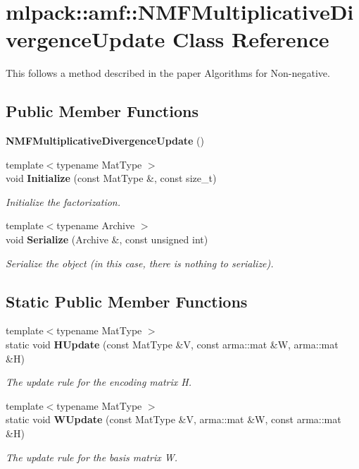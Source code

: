 \section{mlpack\+:\+:amf\+:\+:N\+M\+F\+Multiplicative\+Divergence\+Update Class Reference}
\label{classmlpack_1_1amf_1_1NMFMultiplicativeDivergenceUpdate}


This follows a method described in the paper \textquotesingle{}Algorithms for Non-\/negative.  


\subsection*{Public Member Functions}
\begin{DoxyCompactItemize}
\item 
{\bf N\+M\+F\+Multiplicative\+Divergence\+Update} ()
\item 
{\footnotesize template$<$typename Mat\+Type $>$ }\\void {\bf Initialize} (const Mat\+Type \&, const size\+\_\+t)
\begin{DoxyCompactList}\small\item\em Initialize the factorization. \end{DoxyCompactList}\item 
{\footnotesize template$<$typename Archive $>$ }\\void {\bf Serialize} (Archive \&, const unsigned int)
\begin{DoxyCompactList}\small\item\em Serialize the object (in this case, there is nothing to serialize). \end{DoxyCompactList}\end{DoxyCompactItemize}
\subsection*{Static Public Member Functions}
\begin{DoxyCompactItemize}
\item 
{\footnotesize template$<$typename Mat\+Type $>$ }\\static void {\bf H\+Update} (const Mat\+Type \&V, const arma\+::mat \&W, arma\+::mat \&H)
\begin{DoxyCompactList}\small\item\em The update rule for the encoding matrix H. \end{DoxyCompactList}\item 
{\footnotesize template$<$typename Mat\+Type $>$ }\\static void {\bf W\+Update} (const Mat\+Type \&V, arma\+::mat \&W, const arma\+::mat \&H)
\begin{DoxyCompactList}\small\item\em The update rule for the basis matrix W. \end{DoxyCompactList}\end{DoxyCompactItemize}


